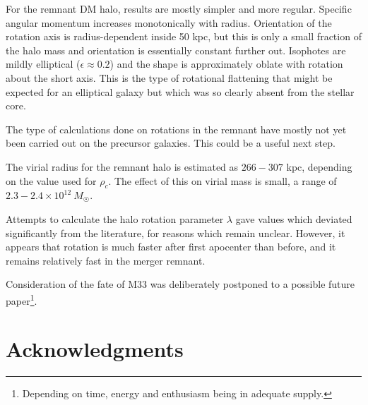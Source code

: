 \documentclass[twocolumn]{aastex63}
\begin{document}
For the remnant DM halo, results are mostly simpler and more regular. Specific angular momentum increases monotonically with radius. Orientation of the rotation axis is radius-dependent inside 50 kpc, but this is only a small fraction of the halo mass and orientation is essentially constant further out. Isophotes are mildly elliptical ($\epsilon \approx 0.2$) and the shape is approximately oblate with rotation about the short axis. This is the type of rotational flattening that might be expected for an elliptical galaxy but which was so clearly absent from the stellar core.

The type of calculations done on rotations in the remnant have mostly not yet been carried out on the precursor galaxies. This could be a useful next step.

The virial radius for the remnant halo is estimated as $266 - 307$ kpc, depending on the value used for $\rho_c$. The effect of this on virial mass is small, a range of $2.3-2.4 \times 10^{12}\ M_\Sun$.

Attempts to calculate the halo rotation parameter $\lambda$ gave values which deviated significantly from the literature, for reasons which remain unclear. However, it appears that rotation is much faster after first apocenter than before, and it remains relatively fast in the merger remnant.

Consideration of the fate of M33 was deliberately postponed to a possible future paper\footnote{Depending on time, energy and enthusiasm being in adequate supply.}.


\section{Acknowledgments}
\end{document}
